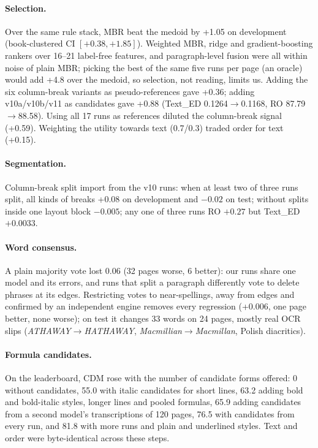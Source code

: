 \documentclass[11pt]{article}
\newcommand{\ted}{Text\_ED}
\newcommand{\ro}{RO}
\begin{document}
\paragraph{Selection.} Over the same rule stack, MBR beat the medoid by +1.05 on development (book-clustered CI $[+0.38,+1.85]$). Weighted MBR, ridge and gradient-boosting rankers over 16--21 label-free features, and paragraph-level fusion were all within noise of plain MBR; picking the best of the same five runs per page (an oracle) would add +4.8 over the medoid, so selection, not reading, limits us. Adding the six column-break variants as pseudo-references gave +0.36; adding v10a/v10b/v11 as candidates gave +0.88 (\ted{} 0.1264$\to$0.1168, \ro{} 87.79$\to$88.58). Using all 17 runs as references diluted the column-break signal (+0.59). Weighting the utility towards text (0.7/0.3) traded order for text (+0.15).

\paragraph{Segmentation.} Column-break split import from the v10 runs: when at least two of three runs split, all kinds of breaks +0.08 on development and $-0.02$ on test; without splits inside one layout block $-0.005$; any one of three runs \ro{} $+0.27$ but \ted{} $+0.0033$.

\paragraph{Word consensus.} A plain majority vote lost 0.06 (32 pages worse, 6 better): our runs share one model and its errors, and runs that split a paragraph differently vote to delete phrases at its edges. Restricting votes to near-spellings, away from edges and confirmed by an independent engine removes every regression (+0.006, one page better, none worse); on test it changes 33 words on 24 pages, mostly real OCR slips (\emph{ATHAWAY}$\to$\emph{HATHAWAY}, \emph{Macmillian}$\to$\emph{Macmillan}, Polish diacritics).

\paragraph{Formula candidates.} On the leaderboard, CDM rose with the number of candidate forms offered: 0 without candidates, 55.0 with italic candidates for short lines, 63.2 adding bold and bold-italic styles, longer lines and pooled formulas, 65.9 adding candidates from a second model's transcriptions of 120 pages, 76.5 with candidates from every run, and 81.8 with more runs and plain and underlined styles. Text and order were byte-identical across these steps.
\end{document}
